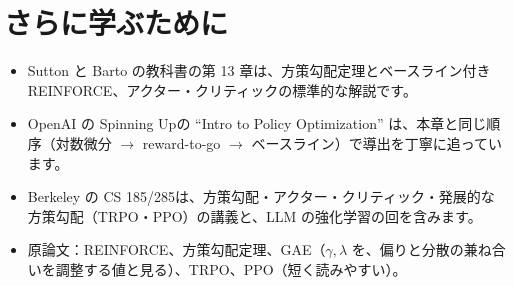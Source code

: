 \section*{さらに学ぶために}

\begin{itemize}
\item Sutton と Barto の教科書\cite{sutton2018rl}の第 13 章は、方策勾配定理とベースライン付き REINFORCE、アクター・クリティックの標準的な解説です。
\item OpenAI の Spinning Up\cite{achiam2018spinningup}の “Intro to Policy Optimization” は、本章と同じ順序（対数微分 $\to$ reward-to-go $\to$ ベースライン）で導出を丁寧に追っています。
\item Berkeley の CS 185/285\cite{cs285}は、方策勾配・アクター・クリティック・発展的な方策勾配（TRPO・PPO）の講義と、LLM の強化学習の回を含みます。
\item 原論文：REINFORCE\cite{williams1992simple}、方策勾配定理\cite{sutton1999policy}、GAE\cite{schulman2016high}（$\gamma,\lambda$ を、偏りと分散の兼ね合いを調整する値と見る）、TRPO\cite{schulman2015trust}、PPO\cite{schulman2017proximal}（短く読みやすい）。
\end{itemize}

